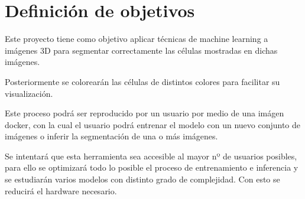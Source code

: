 \chapter{Definici\'on de objetivos}\label{defobjetivos}

Este proyecto tiene como objetivo aplicar técnicas de machine learning a imágenes 3D para segmentar correctamente las células mostradas en dichas imágenes.

Posteriormente se colorearán las células de distintos colores para facilitar su visualización.

Este proceso podrá ser reproducido por un usuario por medio de una imágen docker, con la cual el usuario podrá entrenar el modelo con un nuevo conjunto de imágenes o inferir la segmentación de una o más imágenes.

Se intentará que esta herramienta sea accesible al mayor nº de usuarios posibles, para ello se optimizará todo lo posible el proceso de entrenamiento e inferencia y se estudiarán varios modelos con distinto grado de complejidad. Con esto se reducirá el hardware necesario.